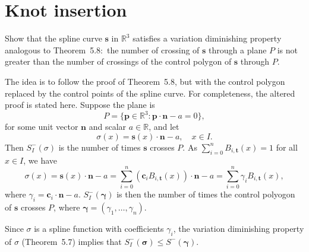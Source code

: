 \section{Knot insertion}

\begin{exercise}
    Show that the spline curve $\mathbf{s}$ in $\mathbb{R}^3$ satisfies a variation diminishing property analogous to Theorem~5.8:\ the number of crossing of $\mathbf{s}$ through a plane $P$ is not greater than the number of crossings of the control polygon of $\mathbf{s}$ through $P$.
\end{exercise}

\begin{solution}
    The idea is to follow the proof of Theorem~5.8, but with the control polygon replaced by the control points of the spline curve.
    For completeness, the altered proof is stated here.
    Suppose the plane is
    \begin{equation*}
        P = \{ \mathbf{p} \in \mathbb{R}^3 : \mathbf{p} \cdot \mathbf{n} - a = 0 \},
    \end{equation*}
    for some unit vector $\mathbf{n}$ and scalar $a \in \mathbb{R}$, and let
    \begin{equation*}
        \sigma(x) = \mathbf{s}(x) \cdot \mathbf{n} - a, \quad x \in I.
    \end{equation*}
    Then $S^{-}_{I}(\sigma)$ is the number of times $\mathbf{s}$ crosses $P$.
    As $\sum_{i = 0}^n B_{i, \mathbf{t}}(x) = 1$ for all $x \in I$, we have
    \begin{equation*}
        \sigma(x) = \mathbf{s}(x) \cdot \mathbf{n} - a = \sum_{i = 0}^n (\mathbf{c}_i B_{i, \mathbf{t}}(x)) \cdot \mathbf{n} - a = \sum_{i = 0}^n \gamma_i B_{i, \mathbf{t}}(x),
    \end{equation*}
    where $\gamma_i = \mathbf{c}_i \cdot \mathbf{n} - a$.
    $S^{-}_I(\boldsymbol{\gamma})$ is then the number of times the control polyogon of $\mathbf{s}$ crosses $P$, where $\boldsymbol{\gamma} = (\gamma_1, \ldots, \gamma_n)$.

    Since $\sigma$ is a spline function with coefficients $\gamma_i$, the variation diminishing property of $\sigma$ (Theorem~5.7) implies that $S^{-}_I(\boldsymbol{\sigma}) \leq S^{-}(\boldsymbol{\gamma})$.
\end{solution}